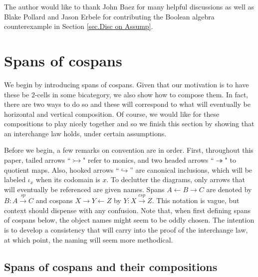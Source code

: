 \documentclass[11pt]{amsart}
\newcommand{\from}{\colon}
\renewcommand{\span}{\xrightarrow{\mathit{sp}}}
\newcommand{\cospan}{\xrightarrow{\mathit{csp}}}
\theoremstyle{remark}
\theoremstyle{definition}
\begin{document}
The author would like to thank John Baez for many helpful discussions as well as Blake Pollard and Jason Erbele for contributing the Boolean algebra counterexample in Section \ref{sec.Disc on Assump}.
%
%
%
%
%
%
%
%
%
%
%
%
%
\section{Spans of cospans} %
\label{sec.SpansOfCospans}
%

We begin by introducing spans of cospans.  Given that our motivation is to have these be $2$-cells in some bicategory, we also show how to compose them.  In fact, there are two ways to do so and these will correspond to what will eventually be horizontal and vertical composition. Of course, we would like for these compositions to play nicely together and so we finish this section by showing that an interchange law holds, under certain assumptions. 

Before we begin, a few remarks on convention are in order. First, throughout this paper, tailed arrows ``$\rightarrowtail$" refer to monics, and two headed arrows ``$\twoheadrightarrow$" to quotient maps. Also, hooked arrows ``$\hookrightarrow$'' are canonical inclusions, which will be labeled $\iota_x$ when its codomain is $x$. To declutter the diagrams, only arrows that will eventually be referenced are given names. Spans $A \leftarrow B \to C$ are denoted by $B \from A \span C$ and cospans $X \to Y \leftarrow Z$ by $Y \from X \cospan Z$. This notation is vague, but context should dispense with any confusion. Note that, when first defining spans of cospans below, the object names might seem to be oddly chosen. The intention is to develop a consistency that will carry into the proof of the interchange law, at which point, the naming will seem more methodical.
%
%
%
%
%
%
\subsection{Spans of cospans and their compositions} %
%
\end{document}
